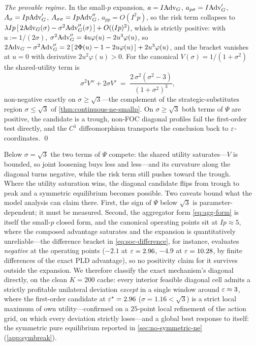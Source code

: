 \emph{The provable regime.} In the small-$p$ expansion, $a = I
\mathrm{Adv}_G$, $a_{p\sigma} = I \mathrm{Adv}_G'$, $A_\sigma = I p \mathrm{Adv}_G'$,
$A_{\sigma\sigma} = I p \mathrm{Adv}_G''$, $a_{pp} = O(I^2 p)$, so the risk
term collapses to $\lambda I p\,[\,2\mathrm{Adv}_G(\sigma) - \sigma^2
\mathrm{Adv}_G''(\sigma)\,] + O((Ip)^2)$, which is strictly positive: with
$u := 1/(2\sigma)$, $\sigma^2 \mathrm{Adv}_G'' = 4 u\varphi(u) - 2
u^3\varphi(u)$, so $2\mathrm{Adv}_G - \sigma^2\mathrm{Adv}_G'' = 2\,[\,2\Phi(u) - 1
- 2 u\varphi(u)\,] + 2 u^3 \varphi(u)$, and the bracket vanishes at
$u = 0$ with derivative $2 u^2 \varphi(u) > 0$. For the canonical
$V(\sigma) = 1/(1+\sigma^2)$ the shared-utility term is
\[
\sigma^2 V'' + 2\sigma V'
\;=\; \frac{2\,\sigma^2 (\sigma^2 - 3)}{(1+\sigma^2)^3},
\]
non-negative exactly on $\sigma \geq \sqrt 3$---the complement of
the strategic-substitutes region $\sigma \leq \sqrt 3$ of
\cref{thm:continuous-ne-smallp}. On $\sigma \geq \sqrt 3$ both
terms of $\Psi$ are positive, the candidate is a trough, non-FOC
diagonal profiles fail the first-order test directly, and the $C^1$
diffeomorphism transports the conclusion back to
$\varepsilon$-coordinates. \qed

Below $\sigma = \sqrt 3$ the two terms of $\Psi$ compete: the
shared utility saturates---$V$ is bounded, so joint loosening buys
less and less---and its curvature along the diagonal turns
negative, while the risk term still pushes toward the trough. Where
the utility saturation wins, the diagonal candidate flips from
trough to peak and a symmetric equilibrium becomes possible. Two
caveats bound what the model analysis can claim there. First, the
sign of $\Psi$ below $\sqrt 3$ is parameter-dependent; it must be
measured. Second, the aggregator form \eqref{eq:agg-form} is itself
the small-$p$ closed form, and the canonical operating points sit
at $I p \approx 5$, where the composed advantage saturates and the
expansion is quantitatively unreliable---the difference bracket in
\eqref{eq:soc-difference}, for instance, evaluates \emph{negative}
at the operating points ($-2.1$ at $\varepsilon = 2.96$, $-4.9$ at $\varepsilon =
10.28$, by finite differences of the exact \ac{PLD} advantage), so
no positivity claim for it survives outside the expansion. We
therefore classify the exact mechanism's diagonal directly, on the
clean $K = 200$ cache: every interior feasible diagonal cell admits
a strictly profitable unilateral deviation \emph{except} in a
single window around $\varepsilon \approx 3$, where the first-order
candidate at $\varepsilon^\star = 2.96$ ($\sigma = 1.16 < \sqrt 3$) is a
strict local maximum of own utility---confirmed on a $25$-point
local refinement of the action grid, on which every deviation
strictly loses---and a global best response to itself: the
symmetric pure equilibrium reported in \cref{sec:no-symmetric-ne}
(\cref{app:symbreak}).

